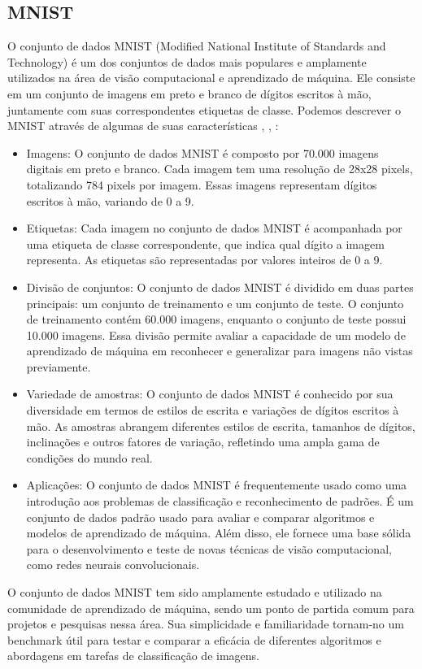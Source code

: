 \documentclass{article}
\begin{document}
\subsection{MNIST}
O conjunto de dados MNIST (Modified National Institute of Standards and Technology) é um dos conjuntos de dados mais populares e amplamente utilizados na área de visão computacional e aprendizado de máquina. Ele consiste em um conjunto de imagens em preto e branco de dígitos escritos à mão, juntamente com suas correspondentes etiquetas de classe. Podemos descrever o MNIST através de algumas de suas características \cite{lecun2010mnist}, \cite{DengLi}, \cite{Mohapatra}:
\begin{itemize}
    \item Imagens: O conjunto de dados MNIST é composto por 70.000 imagens digitais em preto e branco. Cada imagem tem uma resolução de 28x28 pixels, totalizando 784 pixels por imagem. Essas imagens representam dígitos escritos à mão, variando de 0 a 9.
    \item Etiquetas: Cada imagem no conjunto de dados MNIST é acompanhada por uma etiqueta de classe correspondente, que indica qual dígito a imagem representa. As etiquetas são representadas por valores inteiros de 0 a 9.
    \item Divisão de conjuntos: O conjunto de dados MNIST é dividido em duas partes principais: um conjunto de treinamento e um conjunto de teste. O conjunto de treinamento contém 60.000 imagens, enquanto o conjunto de teste possui 10.000 imagens. Essa divisão permite avaliar a capacidade de um modelo de aprendizado de máquina em reconhecer e generalizar para imagens não vistas previamente.
    \item Variedade de amostras: O conjunto de dados MNIST é conhecido por sua diversidade em termos de estilos de escrita e variações de dígitos escritos à mão. As amostras abrangem diferentes estilos de escrita, tamanhos de dígitos, inclinações e outros fatores de variação, refletindo uma ampla gama de condições do mundo real.
    \item Aplicações: O conjunto de dados MNIST é frequentemente usado como uma introdução aos problemas de classificação e reconhecimento de padrões. É um conjunto de dados padrão usado para avaliar e comparar algoritmos e modelos de aprendizado de máquina. Além disso, ele fornece uma base sólida para o desenvolvimento e teste de novas técnicas de visão computacional, como redes neurais convolucionais.
\end{itemize}
O conjunto de dados MNIST tem sido amplamente estudado e utilizado na comunidade de aprendizado de máquina, sendo um ponto de partida comum para projetos e pesquisas nessa área. Sua simplicidade e familiaridade tornam-no um benchmark útil para testar e comparar a eficácia de diferentes algoritmos e abordagens em tarefas de classificação de imagens.
\end{document}
